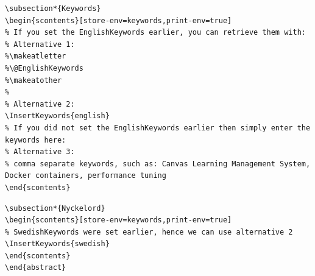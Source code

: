 \clearpage
\begin{lstlisting}[language={[LaTeX]TeX}, caption={Including the English language keywords below the English abstract}, label=lst:keywordsSection]
\subsection*{Keywords}
\begin{scontents}[store-env=keywords,print-env=true]
% If you set the EnglishKeywords earlier, you can retrieve them with:
% Alternative 1:
%\makeatletter
%\@EnglishKeywords
%\makeatother
%
% Alternative 2:
\InsertKeywords{english}
% If you did not set the EnglishKeywords earlier then simply enter the keywords here:
% Alternative 3:
% comma separate keywords, such as: Canvas Learning Management System, Docker containers, performance tuning
\end{scontents}
\end{lstlisting}

\begin{lstlisting}[language={[LaTeX]TeX}, caption={Including the Swedish language keywords below the Swedish abstract}, label=lst:keywordsSectionSwedish]
\subsection*{Nyckelord}
\begin{scontents}[store-env=keywords,print-env=true]
% SwedishKeywords were set earlier, hence we can use alternative 2
\InsertKeywords{swedish}
\end{scontents}
\end{abstract}
\end{lstlisting}



